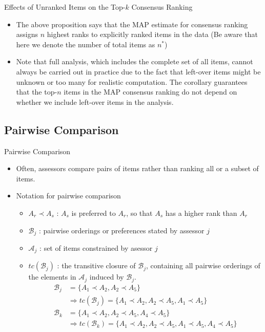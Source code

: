 \documentclass[11pt]{beamer}
\begin{document}
\begin{frame}{Effects of Unranked Items on the Top-$k$ Consensus Ranking}
\begin{itemize}
    \item The above proposition says that the MAP estimate for consensus ranking assigns $n$ highest ranks to explicitly ranked items in the data (Be aware that here we denote the number of total items as $n^*$)
    \item Note that full analysis, which includes the complete set of all  items, cannot always be carried out in practice due to the fact that left-over items might be unknown or too many for realistic computation. The corollary guarantees that the top-$n$ items in the MAP consensus ranking do not depend on whether we include left-over items in the analysis. 
\end{itemize}
\end{frame}

\subsection{Pairwise Comparison}
\begin{frame}{Pairwise Comparison}
\begin{itemize}
    \item Often, assessors compare pairs of items rather than ranking all or a subset of items. 
    \item Notation for pairwise comparison 
    \begin{itemize}
        \item $A_r\prec A_s$ : $A_s$ is preferred to $A_r$, so that $A_s$ has a higher rank than $A_r$ 
        \item $\mathcal{B}_j$ : pairwise orderings or preferences stated by assessor $j$
        \item $\mathcal{A}_j$ : set of items constrained by asessor $j$
        \item $tc(\mathcal{B}_j)$ : the transitive closure of $\mathcal{B}_j$, containing all pairwise orderings of the elements in $\mathcal{A}_j$ induced by $\mathcal{B}_j$.
        \begin{align*}
            \mathcal{B}_j&=\{A_1\prec A_2, A_2\prec A_5\} \\ &\Rightarrow tc(\mathcal{B}_j)=\{A_1\prec A_2, A_2\prec A_5, A_1\prec A_5\} \\\mathcal{B}_k &=\{A_1\prec A_2, A_2\prec A_5, A_4\prec A_5\} \\ &\Rightarrow tc(\mathcal{B}_k)=\{A_1\prec A_2, A_2\prec A_5, A_1\prec A_5, A_4\prec A_5\}
        \end{align*}
    \end{itemize} 
\end{itemize}
\end{frame}
\end{document}
